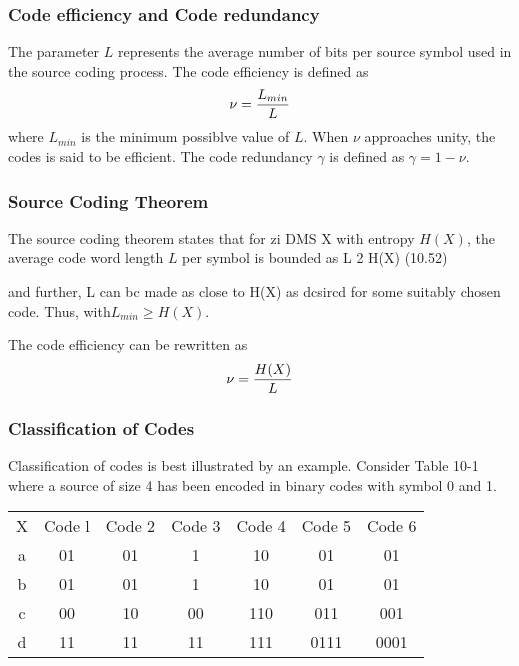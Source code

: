 \documentclass[a4]{beamer}
\begin{document}
\begin{frame}
\frametitle{Code efficiency and Code redundancy}
The parameter $L$ represents the average number of bits per source symbol used in the source coding process.
The code efficiency is defined as \[\nu = {L_{min} \over L} \]where $L_{min}$ is the minimum possiblve value of $L$. When $\nu$ approaches unity, the codes is said to be efficient. 
The code redundancy $\gamma$ is defined as $\gamma = 1- \nu$.
\end{frame}


\begin{frame}
\frametitle{Source Coding Theorem}
The source coding theorem states that for zi DMS X with entropy $H(X)$, the average code word length $L$ per symbol is bounded as
L 2 H(X) (10.52)

and further, L can bc made as close to H(X) as dcsircd for some suitably chosen code.
Thus, with$ L_{min} \geq H(X)$.

The code efficiency can be rewritten as
\[\nu = {H(X) \over L} \]
\end{frame}

\begin{frame}
\frametitle{ Classification of Codes}
Classification of codes is best illustrated by an example. Consider Table 10-1 where a source of
size 4 has been encoded in binary codes with symbol 0 and 1.\\ \bigskip
\begin{tabular}{c c c c c c c}
X& Code l& Code 2& Code 3 &Code 4& Code 5& Code 6\\
a& 01& 01 &1 &10 &01 &01\\
b& 01& 01 &1 &10 &01 &01\\
c &00 &10& 00& 110& 011 &001\\
d &11& 11& 11& 111 &0111 &0001\\
\end{tabular}
\end{frame}
\end{document}
